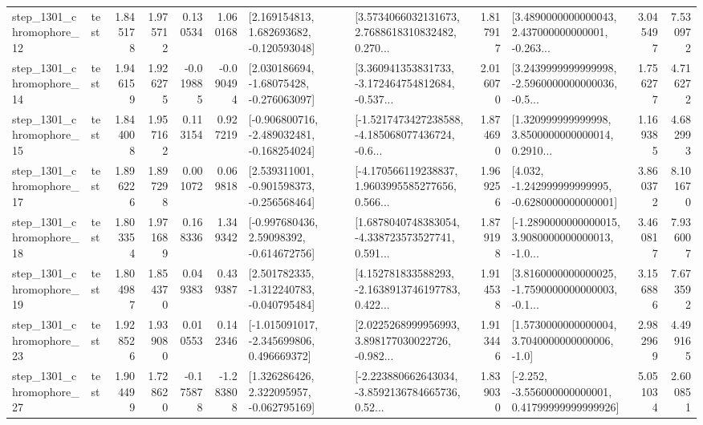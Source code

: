 \begin{tabular}{llrrrrllrlrr}
 step\_1301\_chromophore\_12 &      test &      1.845178 &    1.975712 &      0.130534 &  1.060168 &    [2.169154813, 1.682693682, -0.120593048] &  [3.5734066032131673, 2.7688618310832482, 0.270... &       1.817917 &  [3.4890000000000043, 2.437000000000001, -0.263... &            3.045497 &          7.530972 \\
 step\_1301\_chromophore\_14 &      test &      1.946159 &    1.926275 &     -0.019885 & -0.090494 &    [2.030186694, -1.68075428, -0.276063097] &  [3.360941353831733, -3.172464754812684, -0.537... &       2.016070 &  [3.2439999999999998, -2.5960000000000036, -0.5... &            1.756277 &          4.716272 \\
 step\_1301\_chromophore\_15 &      test &      1.844008 &    1.957162 &      0.113154 &  0.927219 &  [-0.906800716, -2.489032481, -0.168254024] &  [-1.5217473427238588, -4.185068077436724, -0.6... &       1.874690 &  [1.320999999999998, 3.8500000000000014, 0.2910... &            1.169385 &          4.682993 \\
 step\_1301\_chromophore\_17 &      test &      1.896226 &    1.897298 &      0.001072 &  0.069818 &   [2.539311001, -0.901598373, -0.256568464] &  [-4.170566119238837, 1.9603995585277656, 0.566... &       1.969256 &   [4.032, -1.242999999999995, -0.6280000000000001] &            3.860372 &          8.101670 \\
 step\_1301\_chromophore\_18 &      test &      1.803354 &    1.971689 &      0.168336 &  1.349342 &    [-0.997680436, 2.59098392, -0.614672756] &  [1.6878040748383054, -4.338723573527741, 0.591... &       1.879198 &  [-1.2890000000000015, 3.9080000000000013, -1.0... &            3.460817 &          7.936007 \\
 step\_1301\_chromophore\_19 &      test &      1.804987 &    1.854370 &      0.049383 &  0.439387 &   [2.501782335, -1.312240783, -0.040795484] &  [4.152781833588293, -2.1638913746197783, 0.422... &       1.914538 &  [3.8160000000000025, -1.7590000000000003, -0.1... &            3.156886 &          7.673592 \\
 step\_1301\_chromophore\_23 &      test &      1.928526 &    1.939080 &      0.010553 &  0.142346 &   [-1.015091017, -2.345699806, 0.496669372] &  [2.0225268999956993, 3.898177030022726, -0.982... &       1.913446 &     [1.5730000000000004, 3.7040000000000006, -1.0] &            2.982969 &          4.499165 \\
 step\_1301\_chromophore\_27 &      test &      1.904499 &    1.728620 &     -0.175878 & -1.283808 &    [1.326286426, 2.322095957, -0.062795169] &  [-2.223880662643034, -3.8592136784665736, 0.52... &       1.839030 &  [-2.252, -3.556000000000001, 0.41799999999999926] &            5.051034 &          2.600851 \\

\end{tabular}
